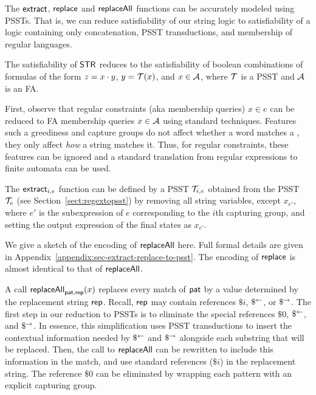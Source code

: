 
The $\mathsf{extract}$, $\mathsf{replace}$ and $\mathsf{replaceAll}$ functions can be accurately modeled using PSSTs.
That is, we can reduce satisfiability of our string logic to satisfiability of a logic containing only concatenation, PSST transductions, and membership of regular languages.

\begin{lemma}\label{lem-str-fun-to-psst}
    The satisfiability of $\mathsf{STR}$ reduces to the satisfiability of boolean combinations of formulas of the form $z=x \cdot y$, $y=\mathcal{T}(x)$, and $x \in \mathcal{A}$, where $\mathcal{T}$ is a PSST and $\mathcal{A}$ is an FA.
\end{lemma}

First, observe that regular constraints (aka membership queries) $x \in e$ can be reduced to FA membership queries $x \in \mathcal{A}$ using standard techniques.
Features such a greediness and capture groups do not affect whether a word matches a {\regexp}, they only affect \emph{how} a string matches it.
Thus, for  regular constraints, these features can be ignored and a standard translation from regular expressions to finite automata can be used.

The $\mathsf{extract}_{i,e}$ function can be defined by a PSST $\mathcal{T}_{i,e}$ obtained from the PSST $\mathcal{T}_e$ (see Section~\ref{sect:regextopsst}) by removing all string variables, except $x_{e'}$, where $e'$ is the subexpression of $e$ corresponding to the $i$th capturing group, and setting the output expression of the final states as $x_{e'}$.

We give a sketch of the encoding of $\mathsf{replaceAll}$ here.
Full formal details are given in Appendix~\ref{appendix:sec-extract-replace-to-psst}.
The encoding of $\mathsf{replace}$ is almost identical to that of $\mathsf{replaceAll}$.

A call $\mathsf{replaceAll}_{\mathsf{pat}, \mathsf{rep}}(x)$ replaces every match of $\mathsf{pat}$ by a value determined by the replacement string $\mathsf{rep}$.
Recall, $\mathsf{rep}$ may contain references $\$i$, $\$^{\leftarrow}$, or $\$^{\rightarrow}$.
The first step in our reduction to PSSTs is to eliminate the special references $\$0$, $\$^{\leftarrow}$, and $\$^{\rightarrow}$.
In essence, this simplification uses PSST transductions to insert the contextual information needed by $\$^{\leftarrow}$ and $\$^{\rightarrow}$ alongside each substring that will be replaced.
Then, the call to $\mathsf{replaceAll}$ can be rewritten to include this information in the match, and use standard references ($\$i$) in the replacement string.
The reference $\$0$ can be eliminated by wrapping each pattern with an explicit capturing group.

